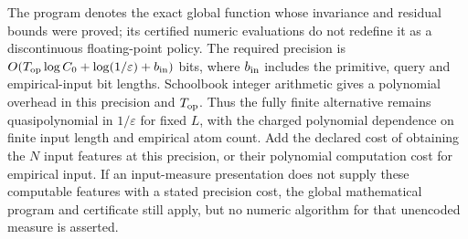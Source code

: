 \documentclass[11pt,a4paper]{article}
\begin{document}
The program denotes the exact global function whose invariance
and residual bounds were proved; its certified numeric evaluations
do not redefine it as a discontinuous floating-point policy.
The required precision is
$O(T_{\rm op}\log C_0+\log(1/\varepsilon)+b_{\rm in})$ bits,
where $b_{\rm in}$ includes the primitive, query and empirical-input
bit lengths. Schoolbook
integer arithmetic gives a polynomial overhead in this precision
and $T_{\rm op}$. Thus the fully finite alternative remains
quasipolynomial in $1/\varepsilon$ for fixed $L$, with the charged
polynomial dependence on finite input length and empirical atom
count. Add the declared
cost of obtaining the $N$ input features at this precision, or
their polynomial computation cost for empirical input.
If an input-measure presentation does not supply these computable
features with a stated precision cost, the global mathematical
program and certificate still apply, but no numeric algorithm for
that unencoded measure is asserted.

\end{document}
